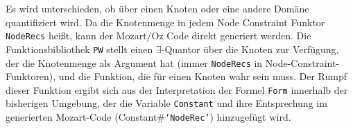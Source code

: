 
Es wird unterschieden, ob \"uber einen Knoten oder eine andere
Dom\"ane quantifiziert wird. Da die Knotenmenge in jedem Node
Constraint Funktor {\tt NodeRecs} hei{\ss}t, kann der Mozart/Oz Code
direkt generiert werden. Die Funktionsbibliothek {\tt PW} stellt einen
$\exists$-Quantor \"uber die Knoten zur Verf\"ugung, der die
Knotenmenge als Argument hat (immer {\tt NodeRecs} in
Node-Constraint-Funktoren), und die Funktion, die f\"ur einen Knoten
wahr sein muss. Der Rumpf dieser Funktion ergibt sich aus der
Interpretation der Formel {\tt Form} innerhalb der bisherigen
Umgebung, der die Variable {\tt Constant} und ihre Entsprechung im
generierten Mozart-Code (Constant\#{\tt 'NodeRec'}) hinzugef\"ugt
wird.

